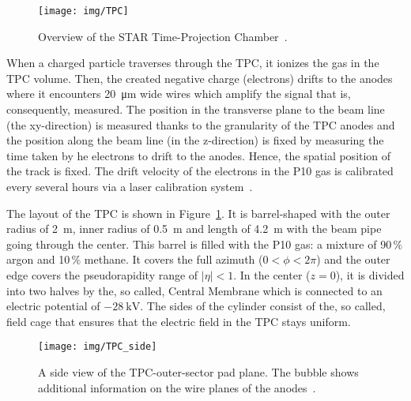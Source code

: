\begin{figure}[htb]
\begin{center}
 \texttt{[image: img/TPC]}\\
\end{center}
\caption{\label{TPC}Overview of the STAR Time-Projection Chamber~\cite{TpcNim}.}
\end{figure}


 

When a charged particle traverses through the TPC, it ionizes the gas in the TPC volume. Then, the created negative 
charge (electrons) drifts to the anodes where it encounters \SI{20}{\micro\metre} wide wires which amplify the signal that is,
consequently, measured. The position in the transverse plane to the beam line (the xy-direction) is measured thanks to the
granularity of the TPC anodes and the position along the beam line (in the z-direction) is fixed by measuring the time taken by
he electrons to drift to the anodes. Hence, the spatial position of the track is fixed. The drift velocity of the electrons
in the P10 gas is calibrated every several hours via a laser calibration system~\cite{laser}. 


The layout of the TPC is shown in Figure~\ref{TPC}. It is barrel-shaped with the outer radius of \SI{2}{\metre}, inner radius of \SI{0.5}{\metre} and length of \SI{4.2}{\metre}
with the beam pipe going through the center. This barrel is filled with the P10 gas: a mixture of 90$\,\%$ argon and 10$\,\%$ methane. It covers the full azimuth ($0 < \phi < 2\pi$) and the outer edge covers the
pseudorapidity range of $|\eta| < 1$. 
In the center ($z = 0$), it is divided into two halves by the, so called, Central Membrane which is connected to an electric 
potential of $-\SI{28}{\kilo\volt}$\@.  The sides of the cylinder consist of the, so called, field cage that ensures that the electric field in the TPC stays uniform.

\begin{figure}[htb]
\begin{center}
 \texttt{[image: img/TPC\_side]}\\
\end{center}
\caption{\label{TPCside}A side view of the TPC-outer-sector pad plane. The bubble shows additional information on the wire planes of the anodes~\cite{TpcNim}.}
\end{figure}

